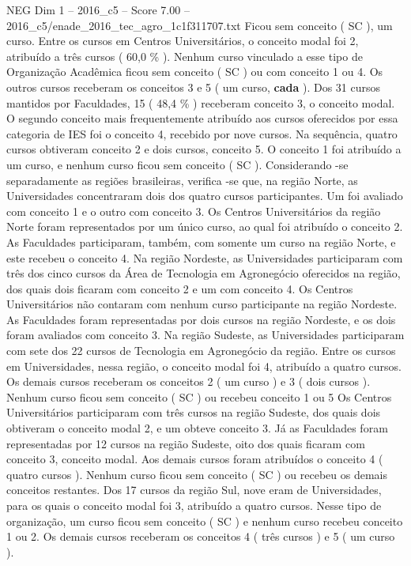 \begin{textsample}{NEG Dim 1 – 2016\_c5 – Score 7.00 – 2016\_c5/enade\_2016\_tec\_agro\_1c1f311707.txt}
Ficou sem conceito ( SC ), um curso.
Entre os cursos em Centros Universitários, o conceito modal foi 2, atribuído a três cursos ( 60,0 \% ).
Nenhum curso vinculado a esse tipo de Organização Acadêmica ficou sem conceito ( SC ) ou com conceito 1 ou 4.
Os outros cursos receberam os conceitos 3 e 5 ( um curso, \textbf{cada} ).
Dos 31 cursos mantidos por Faculdades, 15 ( 48,4 \% ) receberam conceito 3, o conceito modal.
O segundo conceito mais frequentemente atribuído aos cursos oferecidos por essa categoria de IES foi o conceito 4, recebido por nove cursos.
Na sequência, quatro cursos obtiveram conceito 2 e dois cursos, conceito 5.
O conceito 1 foi atribuído a um curso, e nenhum curso ficou sem conceito ( SC ).
Considerando -se separadamente as regiões brasileiras, verifica -se que, na região Norte, as Universidades concentraram dois dos quatro cursos participantes.
Um foi avaliado com conceito 1 e o outro com conceito 3.
Os Centros Universitários da região Norte foram representados por um único curso, ao qual foi atribuído o conceito 2.
As Faculdades participaram, também, com somente um curso na região Norte, e este recebeu o conceito 4.
Na região Nordeste, as Universidades participaram com três dos cinco cursos da Área de Tecnologia em Agronegócio oferecidos na região, dos quais dois ficaram com conceito 2 e um com conceito 4.
Os Centros Universitários não contaram com nenhum curso participante na região Nordeste.
As Faculdades foram representadas por dois cursos na região Nordeste, e os dois foram avaliados com conceito 3.
Na região Sudeste, as Universidades participaram com sete dos 22 cursos de Tecnologia em Agronegócio da região.
Entre os cursos em Universidades, nessa região, o conceito modal foi 4, atribuído a quatro cursos.
Os demais cursos receberam os conceitos 2 ( um curso ) e 3 ( dois cursos ).
Nenhum curso ficou sem conceito ( SC ) ou recebeu conceito 1 ou 5 Os Centros Universitários participaram com três cursos na região Sudeste, dos quais dois obtiveram o conceito modal 2, e um obteve conceito 3.
Já as Faculdades foram representadas por 12 cursos na região Sudeste, oito dos quais ficaram com conceito 3, conceito modal.
Aos demais cursos foram atribuídos o conceito 4 ( quatro cursos ).
Nenhum curso ficou sem conceito ( SC ) ou recebeu os demais conceitos restantes.
Dos 17 cursos da região Sul, nove eram de Universidades, para os quais o conceito modal foi 3, atribuído a quatro cursos.
Nesse tipo de organização, um curso ficou sem conceito ( SC ) e nenhum curso recebeu conceito 1 ou 2.
Os demais cursos receberam os conceitos 4 ( três cursos ) e 5 ( um curso ).

\end{textsample}
